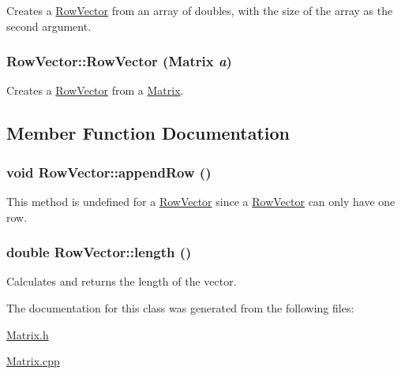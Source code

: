 Creates a \hyperlink{class_row_vector}{RowVector} from an array of doubles, with the size of the array as the second argument. 

\hypertarget{class_row_vector_ae7733fb94cabd44dcb37f2ffabf2cdbc}{
\subsubsection[{RowVector}]{\setlength{\rightskip}{0pt plus 5cm}RowVector::RowVector ({\bf Matrix} {\em a})}}
\label{class_row_vector_ae7733fb94cabd44dcb37f2ffabf2cdbc}


Creates a \hyperlink{class_row_vector}{RowVector} from a \hyperlink{class_matrix}{Matrix}. 



\subsection{Member Function Documentation}
\hypertarget{class_row_vector_aa04552c6bdfed758bc06815d8696b44c}{
\subsubsection[{appendRow}]{\setlength{\rightskip}{0pt plus 5cm}void RowVector::appendRow ()}}
\label{class_row_vector_aa04552c6bdfed758bc06815d8696b44c}


This method is undefined for a \hyperlink{class_row_vector}{RowVector} since a \hyperlink{class_row_vector}{RowVector} can only have one row. 

\hypertarget{class_row_vector_a5c2dde299464fd200026db5515480275}{
\subsubsection[{length}]{\setlength{\rightskip}{0pt plus 5cm}double RowVector::length ()}}
\label{class_row_vector_a5c2dde299464fd200026db5515480275}


Calculates and returns the length of the vector. 



The documentation for this class was generated from the following files:\begin{DoxyCompactItemize}
\item 
\hyperlink{_matrix_8h}{Matrix.h}\item 
\hyperlink{_matrix_8cpp}{Matrix.cpp}\end{DoxyCompactItemize}
